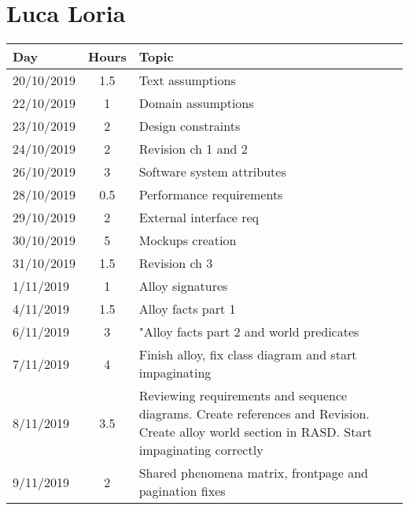 \section{Luca Loria}
\begin{table}[H]
    \centering
    \begin{tabularx}{\textwidth}{ |l|c|X| }
        \hline
        Day & Hours & Topic \\
        \hline
        20/10/2019 & 1.5 & Text assumptions \\								
        \hline
        22/10/2019 & 1	& Domain assumptions \\
        \hline
        23/10/2019 & 2	& Design constraints \\
        \hline								
        24/10/2019 & 2	& Revision ch 1 and 2 \\									
        \hline
        26/10/2019 & 3 & Software system attributes \\									
        \hline
        28/10/2019 & 0.5 & Performance requirements \\									
        \hline
        29/10/2019 & 2	& External interface req \\									
        \hline
        30/10/2019 & 5 & Mockups creation \\									
        \hline
        31/10/2019 & 1.5 & Revision ch 3 \\									
        \hline
        1/11/2019 & 1 & Alloy signatures \\									
        \hline
        4/11/2019 & 1.5 & Alloy facts part 1 \\									
        \hline
        6/11/2019 & 3 & "Alloy facts part 2 and world predicates \\						
        \hline
        7/11/2019 & 4 & Finish alloy, fix class diagram and start impaginating \\		
        \hline
        8/11/2019 & 3.5 & Reviewing requirements and sequence diagrams. Create references and Revision. Create alloy world section in RASD. Start impaginating correctly	\\
        \hline
        9/11/2019 & 2 & Shared phenomena matrix, frontpage and pagination fixes \\
        \hline							
    \end{tabularx}
  \end{table}